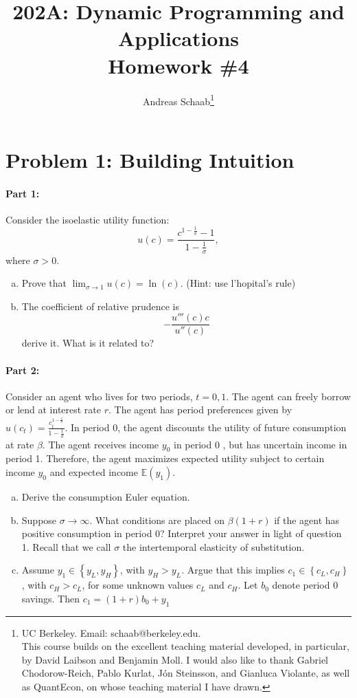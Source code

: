 \documentclass[11pt]{extarticle}
\title{202A: Dynamic Programming and Applications\\[5pt] {\Large \textbf{Homework \#4}}}
\author{Andreas Schaab\footnote{
	UC Berkeley. Email: schaab@berkeley.edu.\\
	This course builds on the excellent teaching material developed, in particular, by David Laibson and Benjamin Moll. I would also like to thank Gabriel Chodorow-Reich, Pablo Kurlat, J\'on Steinsson, and Gianluca Violante, as well as QuantEcon, on whose teaching material I have drawn. 
}}
\date{}
\theoremstyle{plain}
\theoremstyle{definition}
\begin{document}
\maketitle


\section*{Problem 1: Building Intuition}

\paragraph{Part 1:} 
Consider the isoelastic utility function:
\begin{equation*}
	u(c) = \frac{c^{1-\frac{1}{\sigma}}-1}{1-\frac{1}{\sigma}},
\end{equation*}
where $\sigma > 0$.

\begin{enumerate}[(a)]
\item Prove that  $\lim _{\sigma \rightarrow 1} u(c)=\ln (c)$. (Hint: use l'hopital's rule) 

\item The coefficient of relative prudence is $$-\frac{u'''(c)c}{u''(c)}$$ derive it. What is it related to?
\end{enumerate}


\paragraph{Part 2:} 
Consider an agent who lives for two periods, $t=0,1$. The agent can freely borrow or lend at interest rate $r$. The agent has period preferences given by $u(c_t) = \frac{c_t^{1-\frac{1}{\sigma}}}{1-\frac{1}{\sigma}}$. In period 0, the agent discounts the utility of future consumption at rate $\beta$. The agent receives income $y_0$ in period 0 , but has uncertain income in period 1. Therefore, the agent maximizes expected utility subject to certain income $y_0$ and expected income $\mathbb E(y_1)$.

\begin{enumerate}[(a)]
\item Derive the consumption Euler equation.

\item Suppose $\sigma \rightarrow \infty$. What conditions are placed on $\beta(1+r)$ if the agent has positive consumption in period 0? Interpret your answer in light of question 1. Recall that we call $\sigma$ the intertemporal elasticity of substitution.

\item Assume $y_1 \in\left\{y_L, y_H\right\}$, with $y_H>y_L$. Argue that this implies $c_1 \in\left\{c_L, c_H\right\}$, with $c_H>c_L$, for some unknown values $c_L$ and $c_H$. Let $b_0$ denote period 0 savings. Then $c_1=(1+r) b_0+y_1$
\end{enumerate}
\end{document}
